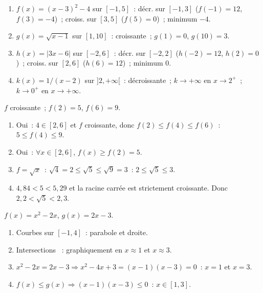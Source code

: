
\begin{enumerate}
  \item $f(x)=(x-3)^2-4$ sur $[-1,5]$~:
        d\'ecr. sur $[-1,3]$ ($f(-1)=12$, $f(3)=-4$)~;
        croiss. sur $[3,5]$ ($f(5)=0$)~; minimum $-4$.
  \item $g(x)=\sqrt{x-1}$ sur $[1,10]$~: croissante~; $g(1)=0$, $g(10)=3$.
  \item $h(x)=|3x-6|$ sur $[-2,6]$~:
        d\'ecr. sur $[-2,2]$ ($h(-2)=12$, $h(2)=0$)~;
        croiss. sur $[2,6]$ ($h(6)=12$)~; minimum $0$.
  \item $k(x)=1/(x-2)$ sur $]2,+\infty[$~: d\'ecroissante~;
        $k\to+\infty$ en $x\to2^+$~; $k\to0^+$ en $x\to+\infty$.
\end{enumerate}


$f$ croissante~; $f(2)=5$, $f(6)=9$.
\begin{enumerate}
  \item Oui~: $4\in[2,6]$ et $f$ croissante, donc $f(2)\leq f(4)\leq f(6)$~: $5\leq f(4)\leq9$.
  \item Oui~: $\forall x\in[2,6]$, $f(x)\geq f(2)=5$.
  \item $f=\sqrt{x}$~: $\sqrt{4}=2\leq\sqrt{5}\leq\sqrt{9}=3$~: $2\leq\sqrt{5}\leq3$.
  \item $4{,}84<5<5{,}29$ et la racine carr\'ee est strictement croissante.
        Donc $2{,}2<\sqrt5<2{,}3$.
\end{enumerate}


$f(x)=x^2-2x$, $g(x)=2x-3$.
\begin{enumerate}
  \item Courbes sur $[-1,4]$~: parabole et droite.
  \item Intersections ~: graphiquement en $x\approx1$ et $x\approx3$.
  \item $x^2-2x=2x-3\Rightarrow x^2-4x+3=(x-1)(x-3)=0$~: $x=1$ et $x=3$.
  \item $f(x)\leq g(x)\Rightarrow(x-1)(x-3)\leq0$~: $x\in[1,3]$.
\end{enumerate}


